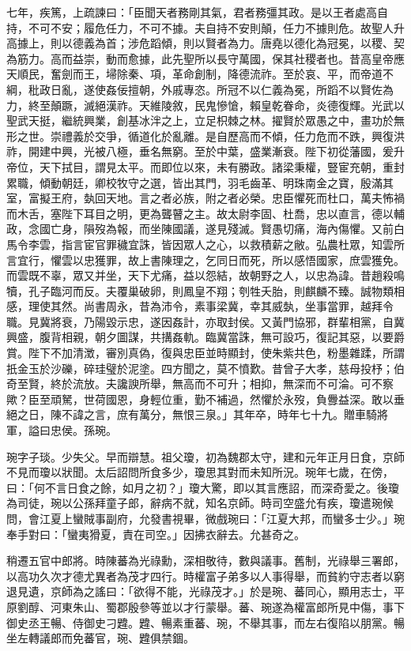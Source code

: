 \begin{pinyinscope}
七年，疾篤，上疏諫曰：「臣聞天者務剛其氣，君者務彊其政。是以王者處高自持，不可不安；履危任力，不可不據。夫自持不安則顛，任力不據則危。故聖人升高據上，則以德義為首；涉危蹈傾，則以賢者為力。唐堯以德化為冠冕，以稷、契為筋力。高而益崇，動而愈據，此先聖所以長守萬國，保其社稷者也。昔高皇帝應天順民，奮劍而王，埽除秦、項，革命創制，降德流祚。至於哀、平，而帝道不綱，秕政日亂，遂使姦佞擅朝，外戚專恣。所冠不以仁義為冕，所蹈不以賢佐為力，終至顛蹶，滅絕漢祚。天維陵敘，民鬼慘愴，賴皇乾眷命，炎德復輝。光武以聖武天挺，繼統興業，創基冰泮之上，立足枳棘之林。擢賢於眾愚之中，畫功於無形之世。崇禮義於交爭，循道化於亂離。是自歷高而不傾，任力危而不跌，興復洪祚，開建中興，光被八極，垂名無窮。至於中葉，盛業漸衰。陛下初從藩國，爰升帝位，天下拭目，謂見太平。而即位以來，未有勝政。諸梁秉權，豎宦充朝，重封累職，傾動朝廷，卿校牧守之選，皆出其門，羽毛齒革、明珠南金之寶，殷滿其室，富擬王府，埶回天地。言之者必族，附之者必榮。忠臣懼死而杜口，萬夫怖禍而木舌，塞陛下耳目之明，更為聾瞽之主。故太尉李固、杜喬，忠以直言，德以輔政，念國亡身，隕歿為報，而坐陳國議，遂見殘滅。賢愚切痛，海內傷懼。又前白馬令李雲，指言宦官罪穢宜誅，皆因眾人之心，以救積薪之敝。弘農杜眾，知雲所言宜行，懼雲以忠獲罪，故上書陳理之，乞同日而死，所以感悟國家，庶雲獲免。而雲既不辜，眾又并坐，天下尤痛，益以怨結，故朝野之人，以忠為諱。昔趙殺鳴犢，孔子臨河而反。夫覆巢破卵，則鳳皇不翔；刳牲夭胎，則麒麟不臻。誠物類相感，理使其然。尚書周永，昔為沛令，素事梁冀，幸其威埶，坐事當罪，越拜令職。見冀將衰，乃陽毀示忠，遂因姦計，亦取封侯。又黃門協邪，群輩相黨，自冀興盛，腹背相親，朝夕圖謀，共搆姦軌。臨冀當誅，無可設巧，復記其惡，以要爵賞。陛下不加清澂，審別真偽，復與忠臣並時顯封，使朱紫共色，粉墨雜蹂，所謂扺金玉於沙礫，碎珪璧於泥塗。四方聞之，莫不憤歎。昔曾子大孝，慈母投杼；伯奇至賢，終於流放。夫讒諛所舉，無高而不可升；相抑，無深而不可淪。可不察歟？臣至頑駑，世荷國恩，身輕位重，勤不補過，然懼於永歿，負釁益深。敢以垂絕之日，陳不諱之言，庶有萬分，無恨三泉。」其年卒，時年七十九。贈車騎將軍，謚曰忠侯。孫琬。

琬字子琰。少失父。早而辯慧。祖父瓊，初為魏郡太守，建和元年正月日食，京師不見而瓊以狀聞。太后詔問所食多少，瓊思其對而未知所況。琬年七歲，在傍，曰：「何不言日食之餘，如月之初？」瓊大驚，即以其言應詔，而深奇愛之。後瓊為司徒，琬以公孫拜童子郎，辭病不就，知名京師。時司空盛允有疾，瓊遣琬候問，會江夏上蠻賊事副府，允發書視畢，微戲琬曰：「江夏大邦，而蠻多士少。」琬奉手對曰：「蠻夷猾夏，責在司空。」因拂衣辭去。允甚奇之。

稍遷五官中郎將。時陳蕃為光祿勳，深相敬待，數與議事。舊制，光祿舉三署郎，以高功久次才德尤異者為茂才四行。時權富子弟多以人事得舉，而貧約守志者以窮退見遺，京師為之謠曰：「欲得不能，光祿茂才。」於是琬、蕃同心，顯用志士，平原劉醇、河東朱山、蜀郡殷參等並以才行蒙舉。蕃、琬遂為權富郎所見中傷，事下御史丞王暢、侍御史刁韙。韙、暢素重蕃、琬，不舉其事，而左右復陷以朋黨。暢坐左轉議郎而免蕃官，琬、韙俱禁錮。


\end{pinyinscope}
